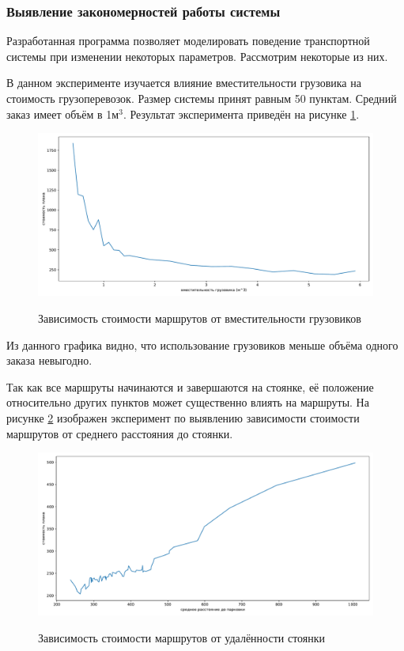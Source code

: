 \subsubsection{Выявление закономерностей работы системы}
Разработанная программа позволяет моделировать поведение транспортной системы при изменении некоторых параметров. Рассмотрим некоторые из них.

В данном эксперименте изучается влияние вместительности грузовика на стоимость грузоперевозок. Размер системы принят равным 50 пунктам. Средний заказ имеет объём в 1м$^3$. Результат эксперимента приведён на рисунке \ref{exp:truck_vol}.

\begin{figure}[h!]
	\begin{center}
		{\includegraphics[scale=0.5, angle=0, page=1]{research/truck_vol.pdf}}
		\caption{Зависимость стоимости маршрутов от вместительности грузовиков}
		\label{exp:truck_vol}
	\end{center}
\end{figure}

Из данного графика видно, что использование грузовиков меньше объёма одного заказа невыгодно. 

Так как все маршруты начинаются и завершаются на стоянке, её положение относительно других пунктов может существенно влиять на маршруты. На рисунке \ref{exp:parking_dist} изображен эксперимент по выявлению зависимости стоимости маршрутов от среднего расстояния до стоянки. 

\begin{figure}[h!]
	\begin{center}
		{\includegraphics[scale=0.5, angle=0, page=1]{research/parking_dist.pdf}}
		\caption{Зависимость стоимости маршрутов от удалённости стоянки}
		\label{exp:parking_dist}
	\end{center}
\end{figure}

